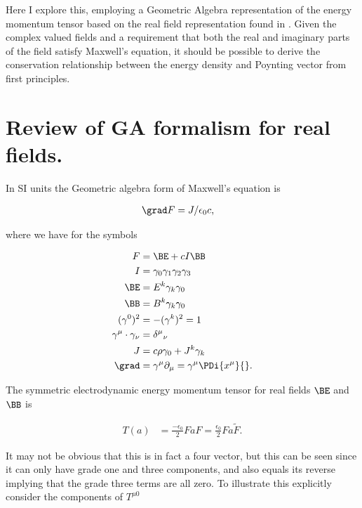 Here I explore this, employing a Geometric Algebra representation of the energy momentum tensor based on the real field representation found in \cite{doran2003gap}.  Given the complex valued fields and a requirement that both the real and imaginary parts of the field satisfy Maxwell's equation, it should be possible to derive the conservation relationship between the energy density and Poynting vector from first principles.

\section{Review of GA formalism for real fields.}

In SI units the Geometric algebra form of Maxwell's equation is

\label{eqn:complexFieldEnergy:4}
\begin{align}
\grad F &= J/\epsilon_0 c,
\end{align}

where we have for the symbols

\begin{subequations}
\begin{align}
\label{eqn:complexFieldEnergy:5}
F &= \BE + c I \BB \\
I &= \gamma_0 \gamma_1 \gamma_2 \gamma_3 \\
\BE &= E^k \gamma_k \gamma_0  \\
\BB &= B^k \gamma_k \gamma_0  \\
(\gamma^0)^2 &= -(\gamma^k)^2 = 1 \\
\gamma^\mu \cdot \gamma_\nu &= {\delta^\mu}_\nu \\
J &= c \rho \gamma_0 + J^k \gamma_k \\
\grad &= \gamma^\mu \partial_\mu = \gamma^\mu \PDi{x^\mu}{}.
\end{align}
\end{subequations}

The symmetric electrodynamic energy momentum tensor for real fields $\BE$ and $\BB$ is

\begin{align}\label{eqn:complexFieldEnergy:6}
T(a) &= \frac{-\epsilon_0}{2} F a F = \frac{\epsilon_0}{2} F a \tilde{F}.
\end{align}

It may not be obvious that this is in fact a four vector, but this can be seen since it can only have grade one and three components, and also equals its reverse implying that the grade three terms are all zero.  To illustrate this explicitly consider the components of $T^{\mu 0}$

